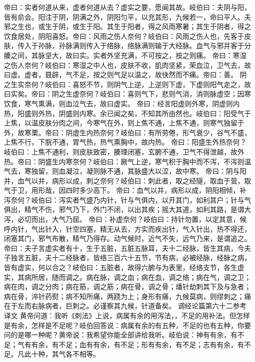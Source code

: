 \documentclass[a4paper,12pt,UTF8,twoside]{ctexbook}
\begin{document}
帝曰：实者何道从来，虚者何道从去？虚实之要，愿闻其故。岐伯曰：夫阴与阳，皆有俞会。阳注于阴，阴满之外，阴阳匀平，以充其形，九候若一，命曰平人。夫邪之生也，或生于阴，或生于阳。其生于阳者，得之风雨寒暑；其生于阴者，得之饮食居处，阴阳喜怒。帝曰：风雨之伤人奈何？岐伯曰：风雨之伤人也，先客于皮肤，传入于孙脉，孙脉满则传入于络脉，络脉满则输于大经脉。血气与邪并客于分腠之间，其脉坚大，故曰实。实者外坚充满，不可按之，按之则痛。
帝曰：寒湿之伤人奈何？岐伯曰：寒湿之中人也，皮肤不收，肌肉坚紧，荣血泣，卫气去，故曰虚。虚者，聂辟，气不足，按之则气足以温之，故快然而不痛。帝曰：善。
阴之生实奈何？岐伯曰：喜怒不节，则阴气上逆，上逆则下虚，下虚则阳气走之，故曰实矣。帝曰：阴之生虚奈何？岐伯曰：喜则气下，悲则气消，消则脉虚空；因寒饮食，寒气熏满，则血泣气去，故曰虚实。
帝曰：经言阳虚则外寒，阴虚则内热，阳盛则外热，阴盛则内寒。余已闻之矣，不知其所由然也。岐伯曰：阳受气于上焦，以温皮肤分肉之间，今寒气在外，则上焦不通，上焦不通，则寒气独留于外，故寒栗。帝曰：阴虚生内热奈何？岐伯曰：有所劳倦，形气衰少，谷气不盛，上焦不行，下脘不通，胃气热，热气熏胸中，故内热。
帝曰：阳盛生外热奈何？岐伯曰：上焦不通利，则皮肤致密，腠理闭塞，玄腑不通，卫气不得泄越，故外热。帝曰：阴盛生内寒奈何？岐伯曰：厥气上逆，寒气积于胸中而不泻，不泻则温气去，寒独留，则血凝泣，凝则脉不通，其脉盛大以涩，故中寒。
帝曰：阴与阳并，血气以并，病形以成，刺之奈何？岐伯曰：刺此者，取之经隧，取血于营，取气于卫，用形哉，因四时多少高下。
帝曰：血气以并，病形以成，阴阳相倾，补泻奈何？岐伯曰：泻实者气盛乃内针，针与气俱内，以开其门，如利其户；针与气俱出，精气不伤，邪气乃下，外门不闭，以出其疾；摇大其道，如利其路，是谓大泻，必切而出，大气乃屈。
帝曰：补虚奈何？岐伯曰：持针勿置，以定其意，候呼内针，气出针入，针空四塞，精无从去，方实而疾出针，气入针出，热不得还，闭塞其门，邪气布散，精气乃得存。动气候时，近气不失，远气乃来，是谓追之。
帝曰：夫子言虚实者有十，生于五脏，五脏五脉耳，夫十二经脉，皆生其病，今夫子独言五脏，夫十二经脉者，皆络三百六十五节，节有病，必被经脉，经脉之病，皆有虚实，何以合之？岐伯曰：五脏者，故得六腑与为表里，经络支节，各生虚实，其病所居，随而调之。病在脉，调之血；病在血，调之络；病在气，调之卫；病在肉，调之分肉；病在筋，调之筋；病在骨，调之骨；燔针劫刺其下及与急者；病在骨，淬针药熨；病不知所痛，两跷为上；身形有痛，九候莫病，则缪刺之；痛在于左而右脉病者，巨刺之。必谨察其九候，针道备矣。
调经论篇第六十二参考译文
黄帝问道：我听《刺法》上说，病属有余的用泻法，，不足的用补法。但怎样是有余，怎样是不足呢？岐伯回答说：病属有余的有五种，不足的也有五种，你要问的是哪一种呢？黄帝说：我希望你能全部讲给我听。岐伯说：神有有余，有不足；气有有余，有不足；血有有余，有不足；形有有余，有不足；志有有余，有不足。凡此十种，其气各不相等。
\end{document}
